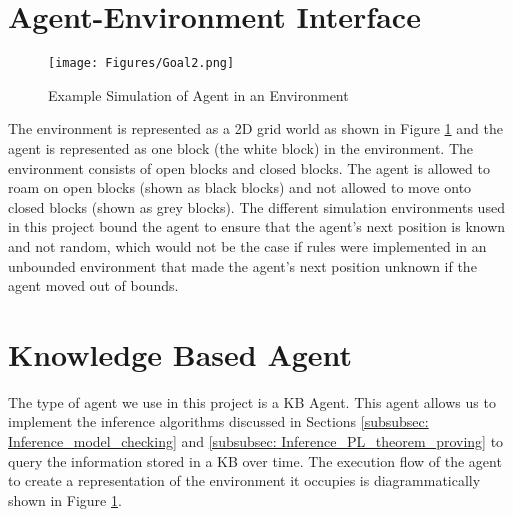 



\section{Agent-Environment Interface}

\begin{figure}[H]
    \centering
    \texttt{[image: Figures/Goal2.png]}
    \caption{Example Simulation of Agent in an Environment} 
    \label{fig:agent_in_env_low_level}
\end{figure}


The environment is represented as a 2D grid world as shown in Figure \ref{fig:agent_in_env_low_level} and the agent is represented as one block (the white block) in the environment. The environment consists of open blocks and closed blocks. The agent is allowed to roam on open blocks (shown as black blocks) and not allowed to move onto closed blocks (shown as grey blocks). The different simulation environments used in this project bound the agent to ensure that the agent's next position is known and not random, which would not be the case if rules were implemented in an unbounded environment that made the agent's next position unknown if the agent moved out of bounds.



\section{Knowledge Based Agent}

The type of agent we use in this project is a KB Agent. This agent allows us to implement the inference algorithms discussed in Sections \ref{subsubsec: Inference_model_checking} and \ref{subsubsec: Inference_PL_theorem_proving} to query the information stored in a KB over time. The execution flow of the agent to create a representation of the environment it occupies is diagrammatically shown in Figure \ref{fig:agent_in_env_low_level}.

